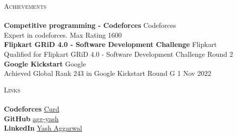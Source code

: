 \documentclass[a4paper]{article}
\newcommand{\lineunder} {
    \vspace*{-8pt} \\
    \hspace*{-18pt} \hrulefill \\
}
\newcommand{\header} [1] {
    {\hspace*{-18pt}\vspace*{6pt} \textsc{#1}}
    \vspace*{-6pt} \lineunder
}
\begin{document}
\header{Achievements}
\textbf{Competitive programming - Codeforces} \hfill Codeforces\\
Expert in codeforces. \hfill Max Rating 1600\\
\vspace*{2mm}
\textbf{Flipkart GRiD 4.0 - Software Development Challenge} \hfill Flipkart\\
Qualified for Flipkart GRiD 4.0 - Software Development Challenge Round 2 \hfill \\
\vspace*{2mm}
\textbf{Google Kickstart} \hfill Google\\
Achieved Global Rank 243 in Google Kickstart Round G \hfill 1 Nov 2022\\
\vspace*{2mm}


\header{Links}
{\textbf{Codeforces}} \hfill \href{https://codeforces.com/profile/Curd}{Curd}\\
\vspace*{2mm}
{\textbf{GitHub}} \hfill \href{https://github.com/agg-yash}{agg-yash}\\
\vspace*{2mm}
{\textbf{LinkedIn}} \hfill \href{https://www.linkedin.com/in/agg-yash/}{Yash Aggarwal}\\
\
\end{document}
